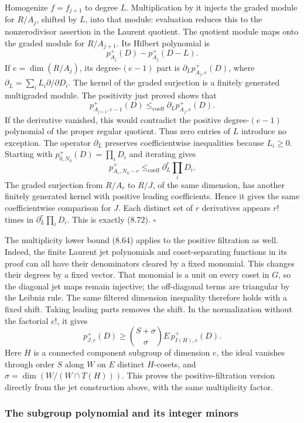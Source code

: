 \documentclass[
  11pt,
  a4paper,
]{article}
\begin{document}
Homogenize \(f=f_{j+1}\) to degree \(L\). Multiplication by it injects
the graded module for \(R/A_j\), shifted by \(L\), into that module:
evaluation reduces this to the nonzerodivisor assertion in the Laurent
quotient. The quotient module maps onto the graded module for
\(R/A_{j+1}\). Its Hilbert polynomial is \[
p_{A_j}^+(D)-p_{A_j}^+(D-L).
\] If \(e=\dim(R/A_j)\), its degree-\((e-1)\) part is
\(\partial_Lp_{A_j,e}^+(D)\), where
\(\partial_L=\sum_i L_i\partial/\partial D_i\). The kernel of the graded
surjection is a finitely generated multigraded module. The positivity
just proved shows that \[
p_{A_{j+1},e-1}^+(D)
\le_{\mathrm{coeff}}\partial_Lp_{A_j,e}^+(D).
\] If the derivative vanished, this would contradict the positive
degree-\((e-1)\) polynomial of the proper regular quotient. Thus zero
entries of \(L\) introduce no exception. The operator \(\partial_L\)
preserves coefficientwise inequalities because \(L_i\ge0\). Starting
with \(p_{0,N_0}^+(D)=\prod_iD_i\) and iterating gives \[
p_{A_r,N_0-r}^+\le_{\mathrm{coeff}}
\partial_L^r\prod_iD_i.
\] The graded surjection from \(R/A_r\) to \(R/J\), of the same
dimension, has another finitely generated kernel with positive leading
coefficients. Hence it gives the same coefficientwise comparison for
\(J\). Each distinct set of \(r\) derivatives appears \(r!\) times in
\(\partial_L^r\prod_iD_i\). This is exactly (8.72). \(\square\)

The multiplicity lower bound (8.64) applies to the positive filtration
as well. Indeed, the finite Laurent jet polynomials and coset-separating
functions in its proof can all have their denominators cleared by a
fixed monomial. This changes their degrees by a fixed vector. That
monomial is a unit on every coset in \(G\), so the diagonal jet maps
remain injective; the off-diagonal terms are triangular by the Leibniz
rule. The same filtered dimension inequality therefore holds with a
fixed shift. Taking leading parts removes the shift. In the
normalization without the factorial \(e!\), it gives \[
p_{J,e}^+(D)\ge
\binom{S+\sigma}{\sigma}E\,p_{I(H),e}^+(D).
\tag{8.73}
\] Here \(H\) is a connected component subgroup of dimension \(e\), the
ideal vanishes through order \(S\) along \(W\) on \(E\) distinct
\(H\)-cosets, and \(\sigma=\dim(W/(W\cap T(H)))\). This proves the
positive-filtration version directly from the jet construction above,
with the same multiplicity factor.

\subsubsection{The subgroup polynomial and its integer
minors}\label{the-subgroup-polynomial-and-its-integer-minors}
\end{document}
